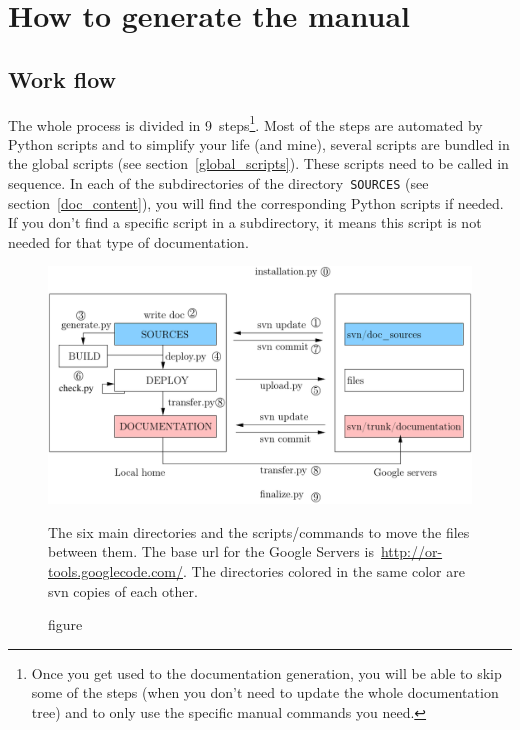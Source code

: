 \documentclass[a4paper,10pt]{article}
\newcommand{\code}[1]{\texttt{#1}}
\begin{document}
\section{How to generate the manual}


\subsection{Work flow}
\label{work_flow}

The whole process is divided in 9~steps\footnote{Once you get used to the documentation generation, you will be able to skip some of the steps (when you don't need to update the whole documentation tree) and to only use the specific manual commands you need.}. Most of the steps are automated by Python scripts and to simplify your life (and mine), several scripts are bundled in the global scripts (see section~\ref{global_scripts}). These scripts need to be called in sequence. In each of the subdirectories of the directory~\code{SOURCES} (see section~\ref{doc_content}), you will find the corresponding Python scripts if needed. If you don't 
find a specific script in a subdirectory, it means this script is not needed for that type of documentation.\\


\begin{figure}[h]
   \centering
   \includegraphics[scale=0.8]{images/directories.pdf}
   \caption{figure}{The six main directories and the scripts/commands to move the files between them. The base url for the Google Servers is~\href{http://or-tools.googlecode.com/}{http://or-tools.googlecode.com/}. The directories colored in the same color are svn copies of each other\footnotemark.}\label{pic_directories}
 \end{figure}
\end{document}
